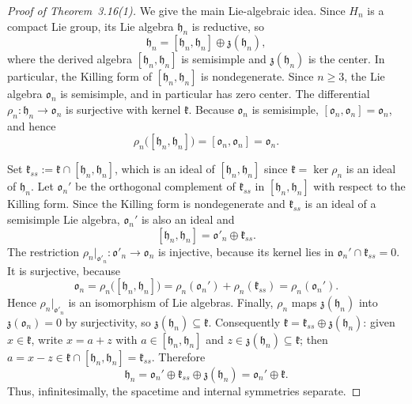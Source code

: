 \documentclass[a4paper,11pt]{article}
\begin{document}
\begin{proof}[Proof of Theorem~3.16(1)]
We give the main Lie-algebraic idea. Since $H_n$ is a compact Lie group,
its Lie algebra $\mathfrak{h}_n$ is reductive, so
\[
    \mathfrak{h}_n = [\mathfrak{h}_n,\mathfrak{h}_n] \oplus \mathfrak{z}(\mathfrak{h}_n),
\]
where the derived algebra $[\mathfrak{h}_n,\mathfrak{h}_n]$ is semisimple and
$\mathfrak{z}(\mathfrak{h}_n)$ is the center. In particular, the Killing form of
$[\mathfrak{h}_n,\mathfrak{h}_n]$ is nondegenerate. Since $n \geq 3$, the Lie algebra $\mathfrak{o}_n$ is semisimple, and in
particular has zero center. The differential $\rho_n : \mathfrak{h}_n \to \mathfrak{o}_n$
is surjective with kernel $\mathfrak{k}$. Because $\mathfrak{o}_n$ is semisimple,
$[\mathfrak{o}_n,\mathfrak{o}_n]=\mathfrak{o}_n$, and hence
\[
    \rho_n\bigl([\mathfrak{h}_n,\mathfrak{h}_n]\bigr)
    = [\mathfrak{o}_n,\mathfrak{o}_n] = \mathfrak{o}_n .
\]

Set $\mathfrak{k}_{ss} := \mathfrak{k}\cap[\mathfrak{h}_n,\mathfrak{h}_n]$, which is an ideal of $[\mathfrak{h}_n,\mathfrak{h}_n]$ since $\mathfrak{k}=\ker\rho_n$ is an ideal of $\mathfrak{h}_n$. Let $\mathfrak{o}_n'$ be the orthogonal complement of $\mathfrak{k}_{ss}$ in
$[\mathfrak{h}_n,\mathfrak{h}_n]$ with respect to the Killing form. Since the Killing form is
nondegenerate and $\mathfrak{k}_{ss}$ is an ideal of a semisimple Lie algebra,
$\mathfrak{o}_n'$ is also an ideal and
\[
    [\mathfrak{h}_n,\mathfrak{h}_n] = \mathfrak{o}'_n \oplus \mathfrak{k}_{ss}.
\]
The restriction $\rho_n|_{\mathfrak{o}'_n} : \mathfrak{o}'_n \to \mathfrak{o}_n$ is injective, because
its kernel lies in $\mathfrak{o}_n'\cap\mathfrak{k}_{ss}=0$. It is surjective, because
\[
    \mathfrak{o}_n = \rho_n\bigl([\mathfrak{h}_n,\mathfrak{h}_n]\bigr)
    = \rho_n(\mathfrak{o}_n') + \rho_n(\mathfrak{k}_{ss}) = \rho_n(\mathfrak{o}_n').
\]
Hence $\rho_n|_{\mathfrak{o}'_n}$ is an isomorphism of Lie algebras. Finally, $\rho_n$ maps $\mathfrak{z}(\mathfrak{h}_n)$ into $\mathfrak{z}(\mathfrak{o}_n)=0$ by
surjectivity, so $\mathfrak{z}(\mathfrak{h}_n)\subseteq\mathfrak{k}$. Consequently
$\mathfrak{k} = \mathfrak{k}_{ss}\oplus\mathfrak{z}(\mathfrak{h}_n)$: given $x\in\mathfrak{k}$, write
$x=a+z$ with $a\in[\mathfrak{h}_n,\mathfrak{h}_n]$ and $z\in\mathfrak{z}(\mathfrak{h}_n)\subseteq\mathfrak{k}$;
then $a=x-z\in\mathfrak{k}\cap[\mathfrak{h}_n,\mathfrak{h}_n]=\mathfrak{k}_{ss}$. Therefore
\[
    \mathfrak{h}_n
    = \mathfrak{o}_n' \oplus \mathfrak{k}_{ss} \oplus \mathfrak{z}(\mathfrak{h}_n)
    = \mathfrak{o}_n' \oplus \mathfrak{k}.
\]
Thus, infinitesimally, the spacetime and internal symmetries separate.
\end{proof}
\end{document}
